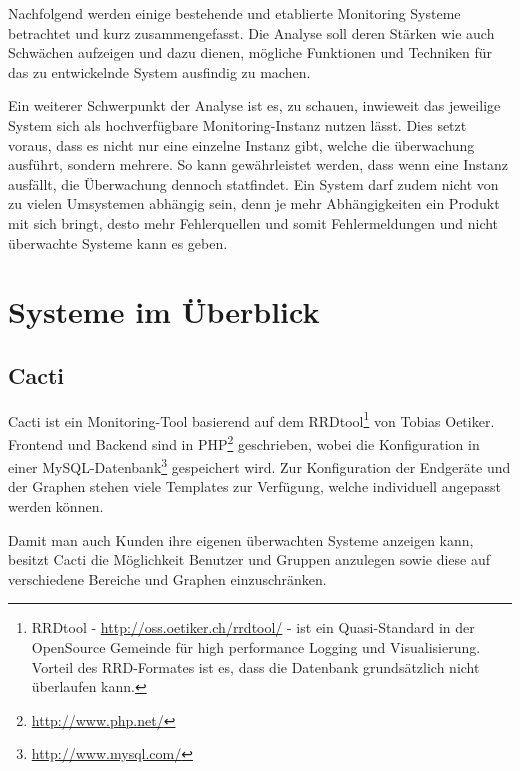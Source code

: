 Nachfolgend werden einige bestehende und etablierte Monitoring Systeme betrachtet und kurz zusammengefasst. Die Analyse soll deren St\"arken wie auch Schw\"achen aufzeigen und dazu dienen, m\"ogliche Funktionen und Techniken f\"ur das zu entwickelnde System ausfindig zu machen.

Ein weiterer Schwerpunkt der Analyse ist es, zu schauen, inwieweit das jeweilige System sich als hochverf\"ugbare Monitoring-Instanz nutzen l\"asst. Dies setzt voraus, dass es nicht nur eine einzelne Instanz gibt, welche die \"uberwachung ausf\"uhrt, sondern mehrere. So kann gew\"ahrleistet werden, dass wenn eine Instanz ausf\"allt, die \"Uberwachung dennoch statfindet. Ein System darf zudem nicht von zu vielen Umsystemen abh\"angig sein, denn je mehr Abh\"angigkeiten ein Produkt mit sich bringt, desto mehr Fehlerquellen und somit Fehlermeldungen und nicht \"uberwachte Systeme kann es geben.

\section{Systeme im \"Uberblick} \label{sec:systeme}
\subsection{Cacti} \label{sec:systeme-cacti}  
  Cacti\cite{cacti} ist ein Monitoring-Tool basierend auf dem RRDtool\footnote{\label{foot:rrdtools}RRDtool\cite{rrdtool} - \url{http://oss.oetiker.ch/rrdtool/} - ist ein Quasi-Standard in der OpenSource Gemeinde f\"ur high performance Logging und Visualisierung. Vorteil des RRD-Formates ist es, dass die Datenbank grunds\"atzlich nicht \"uberlaufen kann.} von Tobias Oetiker. Frontend und Backend sind in PHP\footnote{\label{foot:php}\url{http://www.php.net/}} geschrieben, wobei die Konfiguration in einer MySQL-Datenbank\footnote{\label{foot:mysql}\url{http://www.mysql.com/}} gespeichert wird. Zur Konfiguration der Endger\"ate und der Graphen stehen viele Templates zur Verf\"ugung, welche individuell angepasst werden k\"onnen.

  Damit man auch Kunden ihre eigenen \"uberwachten Systeme anzeigen kann, besitzt Cacti die M\"oglichkeit Benutzer und Gruppen anzulegen sowie diese auf verschiedene Bereiche und Graphen einzuschr\"anken.

